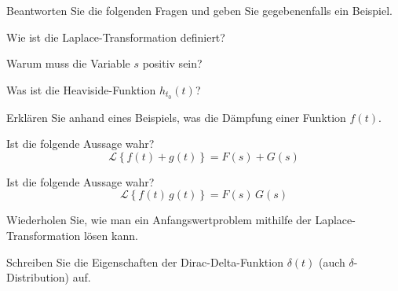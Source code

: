 {
Beantworten Sie die folgenden Fragen und geben Sie gegebenenfalls ein Beispiel.
\begin{iii}
\item Wie ist die Laplace-Transformation definiert?
\item Warum muss die Variable $s$ positiv sein?
\item Was ist die Heaviside-Funktion $h_{t_0}(t)$?
\item Erklären Sie anhand eines Beispiels, was die Dämpfung einer Funktion $f(t)$.
\item Ist die folgende Aussage wahr? $$\mathcal{L}\left\{f(t)+g(t)\right\} = F(s)+G(s)$$
\item Ist die folgende Aussage wahr?
$$\mathcal{L}\left\{f(t)\,g(t)\right\} = F(s)\,G(s)$$
\item Wiederholen Sie, wie man ein Anfangswertproblem mithilfe der Laplace-Transformation
lösen kann.
\item Schreiben Sie die Eigenschaften der Dirac-Delta-Funktion $\delta(t)$ (auch $\delta$-Distribution) auf.
\end{iii}
}


